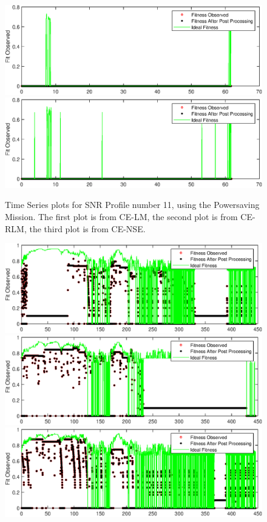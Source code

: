 \begin{appendices}
\begin{figure}[ht!]
\includegraphics{figures/c_sim_timeSeries/Fitness_timeSeries_RLM_11.eps}
\includegraphics{figures/c_sim_timeSeries/Fitness_timeSeries_NSE_11.eps}
\caption{Time Series plots for SNR Profile number 11, using the Powersaving Mission. The first plot is from CE-LM, the second plot is from CE-RLM, the third plot is from CE-NSE.}
\end{figure}
\begin{figure}[ht!]
\includegraphics{figures/c_sim_timeSeries/Fitness_timeSeries_LM_12.eps}
\includegraphics{figures/c_sim_timeSeries/Fitness_timeSeries_RLM_12.eps}
\includegraphics{figures/c_sim_timeSeries/Fitness_timeSeries_NSE_12.eps}

\end{figure}
\end{appendices}
